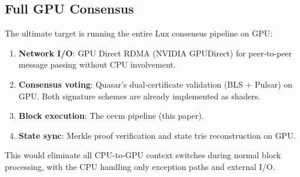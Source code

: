 \subsection{Full GPU Consensus}

The ultimate target is running the entire Lux consensus pipeline on GPU:

\begin{enumerate}
\item \textbf{Network I/O}: GPU Direct RDMA (NVIDIA GPUDirect) for peer-to-peer message
      passing without CPU involvement.
\item \textbf{Consensus voting}: Quasar's dual-certificate validation (BLS + Pulsar)
      on GPU. Both signature schemes are already implemented as shaders.
\item \textbf{Block execution}: The cevm pipeline (this paper).
\item \textbf{State sync}: Merkle proof verification and state trie reconstruction on GPU.
\end{enumerate}

This would eliminate all CPU-to-GPU context switches during normal block processing,
with the CPU handling only exception paths and external I/O.

